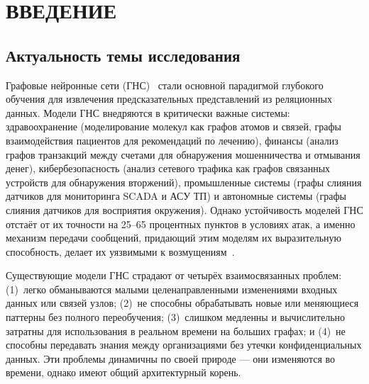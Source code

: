 
\chapter*{ВВЕДЕНИЕ}

\section*{Актуальность темы исследования}

Графовые нейронные сети (ГНС)~\cite{Kipf2017,Velickovic2018,Hamilton2017,Wu2020gnn_survey,Luo2021} стали основной парадигмой глубокого обучения для извлечения предсказательных представлений из реляционных данных. Модели ГНС внедряются в критически важные системы: здравоохранение (моделирование молекул как графов атомов и связей, графы взаимодействия пациентов для рекомендаций по лечению), финансы (анализ графов транзакций между счетами для обнаружения мошенничества и отмывания денег), кибербезопасность (анализ сетевого трафика как графов связанных устройств для обнаружения вторжений), промышленные системы (графы слияния датчиков для мониторинга SCADA и АСУ ТП) и автономные системы (графы слияния датчиков для восприятия окружения). Однако устойчивость моделей ГНС отстаёт от их точности на 25--65 процентных пунктов в условиях атак, а именно механизм передачи сообщений, придающий этим моделям их выразительную способность, делает их уязвимыми к возмущениям~\cite{Zuegner2018,Bojchevski2019,Dai2018,Goodfellow2014gan,Szegedy2014}.

Существующие модели ГНС страдают от четырёх взаимосвязанных проблем: (1)~легко обманываются малыми целенаправленными изменениями входных данных или связей узлов; (2)~не способны обрабатывать новые или меняющиеся паттерны без полного переобучения; (3)~слишком медленны и вычислительно затратны для использования в реальном времени на больших графах; и (4)~не способны передавать знания между организациями без утечки конфиденциальных данных. Эти проблемы динамичны по своей природе --- они изменяются во времени, однако имеют общий архитектурный корень.

